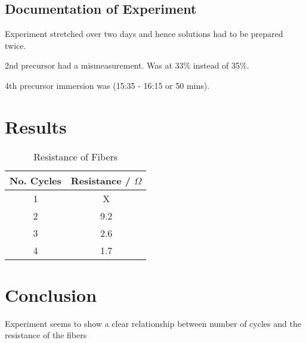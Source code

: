 \documentclass{article}
\begin{document}
\subsection{Documentation of Experiment}
Experiment stretched over two days and hence solutions had to be prepared twice.
\par \noindent
2nd precursor had a mismeasurement. Was at 33\% instead of 35\%.
\par \noindent
4th precursor immersion was (15:35 - 16:15 or 50 mins).

\section{Results}
\begin{table}[h!]
\centering
\begin{tabular}{ |c|c| } 
    \hline
    No. Cycles & Resistance / $\Omega$ \\
    \hline
    1 & X\\
    2 & 9.2\\
    3 & 2.6\\
    4 & 1.7\\
    \hline
\end{tabular}
 \caption{Resistance of Fibers}
\label{table:1}
\end{table}

\section{Conclusion}
Experiment seems to show a clear relationship between number of cycles and the resistance of the fibers
\end{document}
